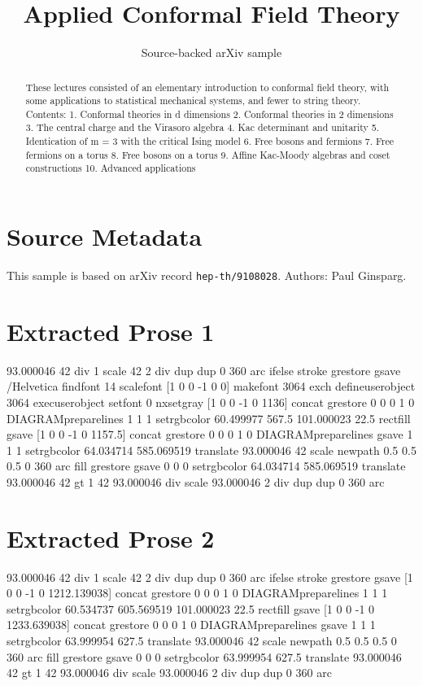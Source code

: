 \documentclass[11pt]{article}
\title{Applied Conformal Field Theory}
\author{Source-backed arXiv sample}
\date{}
\begin{document}
\maketitle
\begin{abstract}
These lectures consisted of an elementary introduction to conformal field theory, with some applications to statistical mechanical systems, and fewer to string theory. Contents: 1. Conformal theories in d dimensions 2. Conformal theories in 2 dimensions 3. The central charge and the Virasoro algebra 4. Kac determinant and unitarity 5. Identication of m = 3 with the critical Ising model 6. Free bosons and fermions 7. Free fermions on a torus 8. Free bosons on a torus 9. Affine Kac-Moody algebras and coset constructions 10. Advanced applications
\end{abstract}
\section{Source Metadata}
This sample is based on arXiv record \texttt{hep-th/9108028}. Authors: Paul Ginsparg.
\section{Extracted Prose 1}
93.000046 42 div 1 scale 42 2 div dup dup 0 360 arc ifelse stroke grestore gsave /Helvetica findfont 14 scalefont [1 0 0 -1 0 0] makefont 3064 exch defineuserobject 3064 execuserobject setfont 0 nxsetgray [1 0 0 -1 0 1136] concat grestore 0 0 0 1 0 DIAGRAMpreparelines 1 1 1 setrgbcolor 60.499977 567.5 101.000023 22.5 rectfill gsave [1 0 0 -1 0 1157.5] concat grestore 0 0 0 1 0 DIAGRAMpreparelines gsave 1 1 1 setrgbcolor 64.034714 585.069519 translate 93.000046 42 scale newpath 0.5 0.5 0.5 0 360 arc fill grestore gsave 0 0 0 setrgbcolor 64.034714 585.069519 translate 93.000046 42 gt 1 42 93.000046 div scale 93.000046 2 div dup dup 0 360 arc
\section{Extracted Prose 2}
93.000046 42 div 1 scale 42 2 div dup dup 0 360 arc ifelse stroke grestore gsave [1 0 0 -1 0 1212.139038] concat grestore 0 0 0 1 0 DIAGRAMpreparelines 1 1 1 setrgbcolor 60.534737 605.569519 101.000023 22.5 rectfill gsave [1 0 0 -1 0 1233.639038] concat grestore 0 0 0 1 0 DIAGRAMpreparelines gsave 1 1 1 setrgbcolor 63.999954 627.5 translate 93.000046 42 scale newpath 0.5 0.5 0.5 0 360 arc fill grestore gsave 0 0 0 setrgbcolor 63.999954 627.5 translate 93.000046 42 gt 1 42 93.000046 div scale 93.000046 2 div dup dup 0 360 arc
\end{document}
